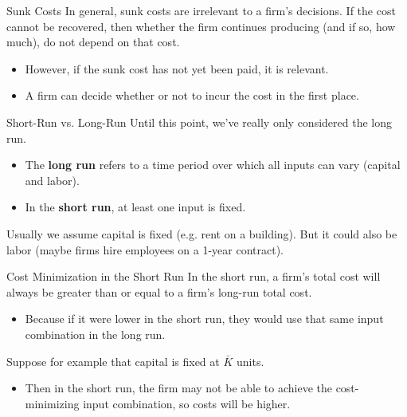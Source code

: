 \documentclass{beamer}
\begin{document}
\begin{frame}{Sunk Costs}
  In general, sunk costs are irrelevant to a firm's decisions. If the cost cannot be recovered, then whether the firm continues producing (and if so, how much), do not depend on that cost.

  \begin{itemize}
    \item However, if the sunk cost has not yet been paid, it is relevant.
    
    \item A firm can decide whether or not to incur the cost in the first place.
  \end{itemize}
\end{frame}

\begin{frame}{Short-Run vs. Long-Run}
  Until this point, we've really only considered the long run.

  \begin{itemize}
    \item The \textbf{long run} refers to a time period over which all inputs can vary (capital and labor).
    \item In the \textbf{short run}, at least one input is fixed.
  \end{itemize}

  \bigskip
  Usually we assume capital is fixed (e.g. rent on a building). But it could also be labor (maybe firms hire employees on a 1-year contract).
\end{frame}

\begin{frame}{Cost Minimization in the Short Run}
  In the short run, a firm's total cost will always be greater than or equal to a firm's long-run total cost.

  \begin{itemize}
    \item Because if it were lower in the short run, they would use that same input combination in the long run.
  \end{itemize}

  \bigskip
  Suppose for example that capital is fixed at $\bar{K}$ units.

  \begin{itemize}
    \item Then in the short run, the firm may not be able to achieve the cost-minimizing input combination, so costs will be higher.
  \end{itemize}
\end{frame}
\end{document}
